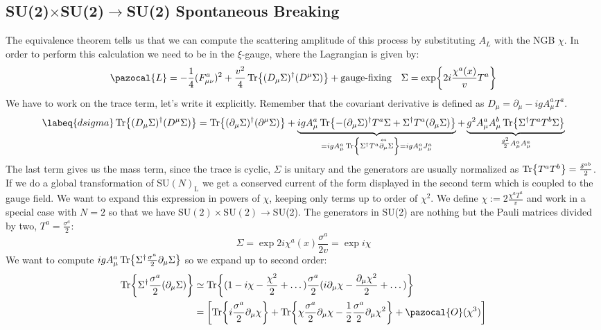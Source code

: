 \documentclass[../main.tex]{subfiles}
\begin{document}
\subsection{SU(2)$\times$SU(2)$\to$SU(2) Spontaneous Breaking}
The equivalence theorem tells us that we can compute the scattering amplitude of this process by substituting $A_L$ with the NGB $\chi$. In order to perform this calculation we need to be in the $\xi$-gauge, where the Lagrangian is given by:
\[
\pazocal{L}=-\frac{1}{4}(F_{\mu\nu}^a)^2+\frac{v^2}{4}\Tr{(D_\mu\Sigma)^\dagger(D^\mu\Sigma)}+\text{gauge-fixing} \quad \Sigma=\exp{2i\frac{\chi^a(x)}{v}T^a}
\]
We have to work on the trace term, let's write it explicitly. Remember that the covariant derivative is defined as $D_\mu=\partial_\mu-igA_\mu^aT^a$.
\begin{equation}
\labeq{dsigma}
\Tr{(D_\mu\Sigma)^\dagger(D^\mu\Sigma)}=\Tr{(\partial_\mu\Sigma)^\dagger(\partial^\mu\Sigma)}+\underbrace{igA_\mu^a\Tr{-(\partial_\mu\Sigma)^\dagger T^a\Sigma+\Sigma^\dagger T^a(\partial_\mu\Sigma)}}_{=igA_\mu^a\Tr{\Sigma^\dagger T^a\overset{\leftrightarrow}{\partial_\mu}\Sigma}=igA_\mu^aJ_\mu^a}+\underbrace{g^2A_\mu^aA_\mu^b\Tr{\Sigma^\dagger T^aT^b\Sigma}}_{\frac{g^2}{2}A_\mu^aA_\mu^a}
\end{equation}
The last term gives us the mass term, since the trace is cyclic, $\Sigma$ is unitary and the generators are usually normalized as $\Tr{T^aT^b}=\frac{\delta^{ab}}{2}$. If we do a global transformation of SU$(N)_{\text{L}}$ we get a conserved current of the form displayed in the second term which is coupled to the gauge field. We want to expand this expression in powers of $\chi$, keeping only terms up to order of $\chi^2$. We define $\chi:=2\frac{\chi^aT^a}{v}$ and work in a special case with $N=2$ so that we have SU$(2)\times$SU$(2)\to$SU(2). The generators in SU(2) are nothing but the Pauli matrices divided by two, $T^a=\frac{\sigma^a}{2}$:
\[
\Sigma=\exp{2i\chi^a(x)\frac{\sigma^a}{2v}}=\exp{i\chi}
\]
We want to compute $igA_\mu^a\Tr{\Sigma^\dagger\frac{\sigma^a}{2}\partial_\mu\Sigma}$ so we expand up to second order:
\begin{align*}
\Tr{\Sigma^\dagger\frac{\sigma^a}{2}(\partial_\mu\Sigma)}&\simeq\Tr{(1-i\chi-\frac{\chi^2}{2}+\dots)\frac{\sigma^a}{2}(i\partial_\mu\chi-\frac{\partial_\mu\chi^2}{2}+\dots)}\\
&=\left[\Tr{i\frac{\sigma^a}{2}\partial_\mu\chi}+\Tr{\chi\frac{\sigma^a}{2}\partial_\mu\chi-\frac{1}{2}\frac{\sigma^a}{2}\partial_\mu\chi^2}+\pazocal{O}(\chi^3)\right]
\end{align*}
\end{document}
